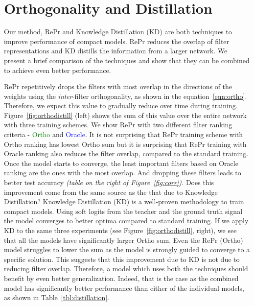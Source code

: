 \section{Orthogonality and Distillation} \label{lbl:distillation}
Our method, RePr and Knowledge Distillation (KD) are both techniques to improve performance of compact models.
RePr reduces the overlap of filter representations and KD distills the information from a larger network. 
We present a brief comparison of the techniques and show that they can be combined to achieve even better performance.

RePr repetitively drops the filters with most overlap in the directions of the weights using the \textit{inter}-filter orthogonality, as shown in the equation~\ref{eqn:ortho}. 
Therefore, we expect this value to gradually reduce over time during training.
Figure~\ref{fig:orthodistill} (left) shows the sum of this value over the entire network with three training schemes.
We show RePr with two different filter ranking criteria - \textcolor{green}{Ortho} and \textcolor{blue}{Oracle}. 
It is not surprising that RePr training scheme with Ortho ranking has lowest Ortho sum but it is surprising that RePr training with Oracle ranking also reduces the filter overlap, compared to the standard training.
Once the model starts to converge, the least important filters based on Oracle ranking are the ones with the most overlap.
And dropping these filters leads to better test accuracy \textit{(table on the right of  Figure~\ref{fig:corr}).}
Does this improvement come from the same source as the that due to Knowledge Distillation?
Knowledge Distillation (KD) is a well-proven methodology to train compact models. 
Using soft logits from the teacher and the ground truth signal the model converges to better optima compared to standard training. 
If we apply KD to the same three experiments (see Figure~\ref{fig:orthodistill}, right), we see that all the models have significantly larger Ortho sum. Even the RePr (Ortho) model struggles to lower the sum as the model is strongly guided to converge to a specific solution.
This suggests that this improvement due to KD is not due to reducing filter overlap. Therefore, a model which uses both the techniques should benefit by even better generalization.
Indeed, that is the case as the combined model has significantly better performance than either of the individual models, as shown in  Table~\ref{tbl:distillation}. 

